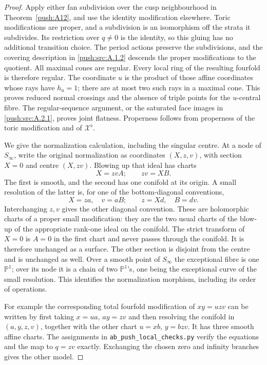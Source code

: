 \begin{proof}
Apply either fan subdivision over the cusp neighbourhood in
Theorem~\ref{push:A12}, and use the identity modification elsewhere.
Toric modifications are proper, and a subdivision is an
isomorphism off the strata it subdivides. Its restriction over
$q\ne0$ is the identity, so this gluing has no additional
transition choice. The period actions preserve the subdivisions,
and the covering description in \ref{push:src:A.1.2} descends the proper
modifications to the quotient. All maximal cones are regular.
Every local ring of the resulting fourfold is therefore regular.
The coordinate $u$ is the product of those affine coordinates
whose rays have $h_u=1$; there are at most two such rays in a
maximal cone. This proves reduced normal crossings and the absence
of triple points for the $u$-central fibre. The regular-sequence
argument, or the saturated face images in \ref{push:src:A.2.1}, proves joint
flatness. Properness follows from properness of the toric
modification and of $\mathcal X^\flat$.

We give the normalization calculation, including the singular
centre. At a node of $S_\infty$, write the original normalization
as coordinates $(X,z,v)$, with section $X=0$ and centre
$(X,zv)$. Blowing up that ideal has charts
\[
 X=zvA;\qquad zv=XB.
\]
The first is smooth, and the second has one conifold at its
origin. A small resolution of the latter is, for one of the
bottom-diagonal conventions,
\[
 X=za,\quad v=aB;\qquad z=Xd,\quad B=dv.
\]
Interchanging $z,v$ gives the other diagonal convention. These
are holomorphic charts of a proper small modification: they are
the two usual charts of the blow-up of the appropriate rank-one
ideal on the conifold. The strict transform of $X=0$ is $A=0$
in the first chart and never passes through the conifold. It is
therefore unchanged as a surface. The other section is disjoint
from the centre and is unchanged as well. Over a smooth point
of $S_\infty$ the exceptional fibre is one $\mathbb P^1$;
over its node it is a chain of two $\mathbb P^1$'s, one being
the exceptional curve of the small resolution. This identifies
the normalization morphism, including its order of operations.

For example the corresponding total fourfold modification of
$xy=uzv$ can be written by first taking $x=ua$, $ay=zv$ and
then resolving the conifold in $(a,y,z,v)$, together with the
other chart $u=xb$, $y=bzv$. It has three smooth affine charts.
The assignments in \texttt{ab\_push\_local\_checks.py} verify
the equations and the map to $q=zv$ exactly. Exchanging the
chosen zero and infinity branches gives the other model.


\end{proof}
